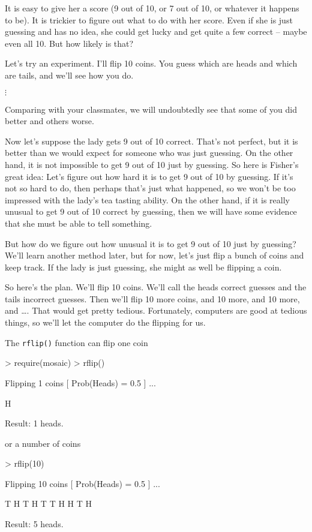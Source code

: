 It is easy to give her a score (9 out of 10, or 7 out of 10, or whatever
it happens to be).  It is trickier to figure out what to do with her score.
Even if she is just guessing and has no idea, she could get lucky and 
get quite a few correct -- maybe even all 10.  But how likely is that?

Let's try an experiment.  I'll flip 10 coins.  You guess which are heads and
which are tails, and we'll see how you do.  

$\vdots$

Comparing with your classmates, we will undoubtedly see that some 
of you did better and others worse.

Now let's suppose the lady gets 9 out of 10 correct.  That's not perfect,
but it is better than we would expect for someone who was just guessing.
On the other hand, it is not impossible to get 9 out of 10 just by guessing.
So here is Fisher's great idea:  Let's figure out how hard it is to get
9 out of 10 by guessing.  If it's not so hard to do, then perhaps that's 
just what happened, so we won't be too impressed with the lady's tea tasting
ability.  On the other hand, if it is really unusual to get 9 out of 10 
correct by guessing, then we will have some evidence that she must 
be able to tell something.

But how do we figure out how unusual it is to get 9 out of 10 just by 
guessing?  We'll learn another method later, but for now, let's just 
flip a bunch of coins and keep track.  If the lady is just guessing, she 
might as well be flipping a coin.

So here's the plan.  We'll flip 10 coins.  We'll call the heads correct 
guesses and the tails incorrect guesses.  Then we'll flip 10 more coins,
and 10 more, and 10 more, and \dots.  That would get pretty tedious.
Fortunately, computers are good at tedious things, so we'll let the computer 
do the flipping for us.

The \verb!rflip()! function can flip one coin

\begin{Schunk}
\begin{Sinput}
> require(mosaic)
> rflip()
\end{Sinput}
\begin{Soutput}
Flipping 1 coins [ Prob(Heads) = 0.5 ] ...

H

Result: 1 heads.
\end{Soutput}
\end{Schunk}
or a number of coins
\begin{Schunk}
\begin{Sinput}
> rflip(10)
\end{Sinput}
\begin{Soutput}
Flipping 10 coins [ Prob(Heads) = 0.5 ] ...

T H T H T T H H T H

Result: 5 heads.
\end{Soutput}
\end{Schunk}

